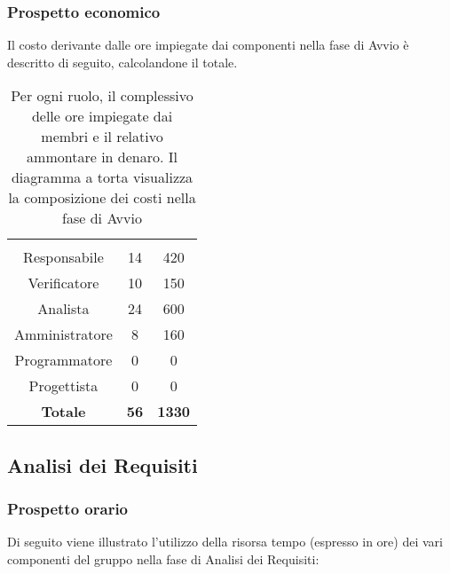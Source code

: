 \subsubsection{Prospetto economico}
Il costo derivante dalle ore impiegate dai componenti nella fase di Avvio è descritto di seguito, calcolandone il totale.

\begin{table}[H]
{\setlength{\parindent}{0cm}
\begin{minipage}{.43\textwidth}
	\begin{tabular}{ccc}
	\rowcolorhead
	\headertitle{Ruolo} & \headertitle{Ore} & \headertitle{Costo(€)}\\
	Responsabile & 14 & 420\\
	Verificatore & 10 & 150\\
	Analista & 24 & 600\\
	Amministratore & 8 & 160\\
	Programmatore & 0 & 0\\
	Progettista & 0 & 0\\
	\hline
	\textbf{Totale} & \textbf{56} & \textbf{1330}\\
	\end{tabular}
\end{minipage}%
\begin{minipage}{.57\textwidth}
\end{minipage} }
\caption[Prospetto economico della fase di Avvio]{Per ogni ruolo, il complessivo delle ore impiegate dai membri e il relativo ammontare in denaro. Il diagramma a torta visualizza la composizione dei costi nella fase di Avvio}
\end{table}



\subsection{Analisi dei Requisiti}

\subsubsection{Prospetto orario}
Di seguito viene illustrato l'utilizzo della risorsa tempo (espresso in ore) dei vari componenti del gruppo nella fase di Analisi dei Requisiti:

